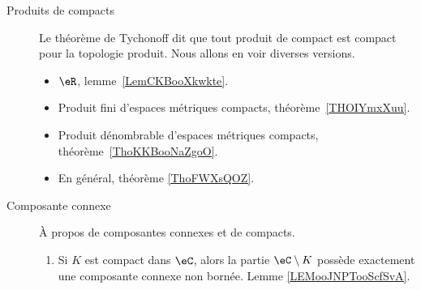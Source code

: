 \begin{description}
	\item[Produits de compacts]
		Le théorème de Tychonoff dit que tout produit de compact est compact pour la topologie produit. Nous allons en voir diverses versions.
		\begin{itemize}
			\item
			      \( \eR\), lemme~\ref{LemCKBooXkwkte}.
			\item
			      Produit fini d'espaces métriques compacts, théorème~\ref{THOIYmxXuu}.
			\item
			      Produit dénombrable d'espaces métriques compacts, théorème~\ref{ThoKKBooNaZgoO}.
			\item
			      En général, théorème \ref{ThoFWXsQOZ}.
		\end{itemize}
	\item[Composante connexe]
		À propos de composantes connexes et de compacts.
		\begin{enumerate}
			\item
			      Si \( K\) est compact dans \( \eC\), alors la partie \( \eC\setminus K\) possède exactement une composante connexe non bornée. Lemme \ref{LEMooJNPTooScfSvA}.
		\end{enumerate}
\end{description}
